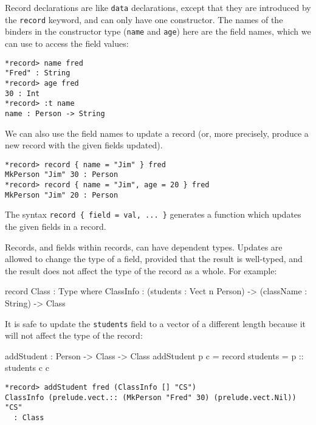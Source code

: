 \noindent
Record declarations are like \texttt{data} declarations, except that they are  introduced by the \texttt{record} keyword, and can only have one constructor.
The names of the binders in the constructor type (\texttt{name} and \texttt{age}) here are the field names, which we can use to access the field values:

\begin{lstlisting}[style=stdout]
*record> name fred
"Fred" : String
*record> age fred
30 : Int
*record> :t name
name : Person -> String
\end{lstlisting}

\noindent
We can also use the field names to update a record (or, more precisely, produce a new record with the given fields updated).

\begin{lstlisting}[style=stdout]
*record> record { name = "Jim" } fred
MkPerson "Jim" 30 : Person
*record> record { name = "Jim", age = 20 } fred
MkPerson "Jim" 20 : Person
\end{lstlisting}

\noindent
The syntax \texttt{record \{ field = val, ... \}} generates a function which updates the given fields in a record.

Records, and fields within records, can have dependent types.
Updates are allowed to change the type of a field, provided that the result is well-typed, and the result does not affect the type of the record as a whole.
For example:

\begin{code}
record Class : Type where
    ClassInfo : (students : Vect n Person) ->
                (className : String) ->
                Class
\end{code}

\noindent
It is safe to update the \texttt{students} field to a vector of a different length because it will not affect the type of the record:

\begin{code}
addStudent : Person -> Class -> Class
addStudent p c = record { students = p :: students c } c
\end{code}

\begin{lstlisting}[style=stdout]
*record> addStudent fred (ClassInfo [] "CS")
ClassInfo (prelude.vect.:: (MkPerson "Fred" 30) (prelude.vect.Nil)) "CS"
  : Class
\end{lstlisting}

